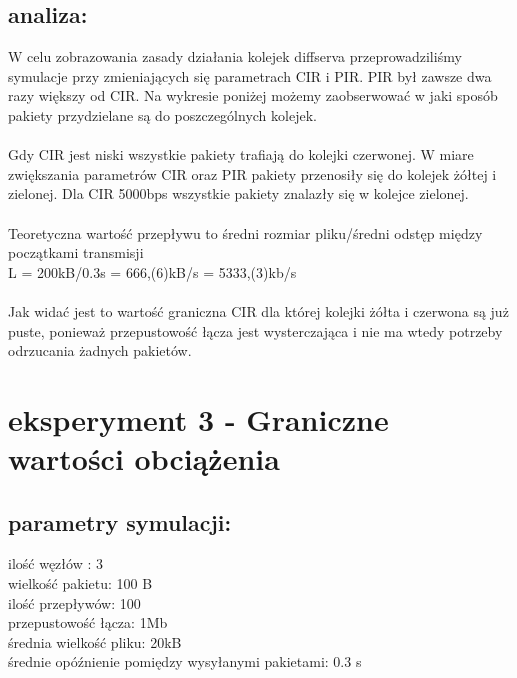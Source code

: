 \documentclass[a4paper]{article}
\begin{document}
\subsection{analiza:}

W celu zobrazowania zasady działania kolejek diffserva przeprowadziliśmy symulacje przy zmieniających się parametrach CIR i PIR. PIR był zawsze dwa razy większy od CIR.
Na wykresie poniżej możemy zaobserwować w jaki sposób pakiety przydzielane są do poszczególnych kolejek.\\
\\






Gdy CIR jest niski wszystkie pakiety trafiają do kolejki czerwonej. W miare zwiększania parametrów CIR oraz PIR pakiety przenosiły się do kolejek żółtej i zielonej. Dla CIR 5000bps wszystkie pakiety znalazły się w kolejce zielonej.\\
\\

Teoretyczna wartość przepływu to średni rozmiar pliku/średni odstęp między początkami transmisji\\
L = 200kB/0.3s = 666,(6)kB/s = 5333,(3)kb/s\\
\\

Jak widać jest to wartość graniczna CIR dla której kolejki żółta i czerwona są już puste, ponieważ przepustowość łącza jest wysterczająca i nie ma wtedy potrzeby odrzucania żadnych pakietów.

\section{eksperyment 3 - Graniczne wartości obciążenia}


\subsection{parametry symulacji:}

 
ilość węzłów : 3\\
wielkość pakietu: 100 B\\
ilość przepływów: 100\\
przepustowość łącza: 1Mb\\
średnia wielkość pliku: 20kB\\
średnie opóźnienie pomiędzy wysyłanymi pakietami: 0.3 s\\
\end{document}
